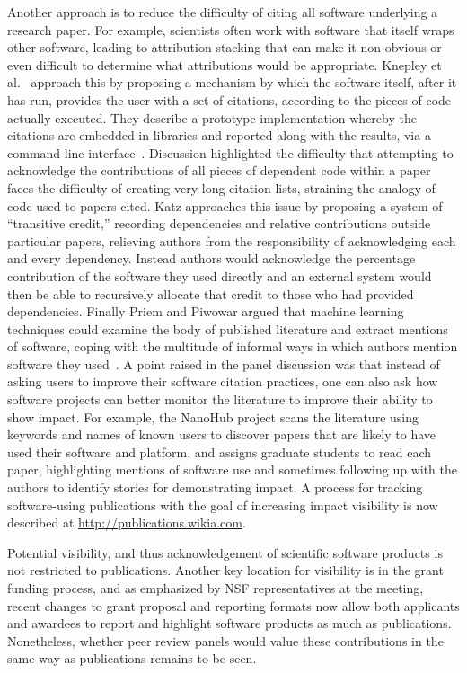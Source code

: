 \documentclass[11pt, oneside]{amsart}
\begin{document}
Another approach is to reduce the difficulty of citing all software
underlying a research paper. For example, scientists often work with
software that itself wraps other software, leading to attribution
stacking that can make it non-obvious or even difficult to determine
what attributions would be appropriate. Knepley et
al.~\cite{Knepley_WSSSPE} approach this by proposing a mechanism by
which the software itself, after it has run, provides the user with a
set of citations, according to the pieces of code actually
executed. They describe a prototype implementation whereby the
citations are embedded in libraries and reported along with the
results, via a command-line
interface~\cite{Knepley_WSSSPE}. Discussion highlighted the difficulty
that attempting to acknowledge the contributions of all pieces of
dependent code within a paper faces the difficulty of creating very
long citation lists, straining the analogy of code used to papers
cited. Katz approaches this issue by proposing a system of
``transitive credit,'' recording dependencies and relative
contributions outside particular papers, relieving authors from the
responsibility of acknowledging each and every dependency. Instead
authors would acknowledge the percentage contribution of the software
they used directly and an external system would then be able to
recursively allocate that credit to those who had provided
dependencies. Finally Priem and Piwowar argued that machine learning
techniques could examine the body of published literature and extract
mentions of software, coping with the multitude of informal ways in
which authors mention software they used~\cite{Priem_WSSSPE}.  A point
raised in the panel discussion was that instead of asking users to
improve their software citation practices, one can also ask how
software projects can better monitor the literature to improve their
ability to show impact. For example, the NanoHub project scans the
literature using keywords and names of known users to discover papers
that are likely to have used their software and platform, and assigns
graduate students to read each paper, highlighting mentions of
software use and sometimes following up with the authors to identify
stories for demonstrating impact.  A process for tracking
software-using publications with the goal of increasing impact
visibility is now described at \url{http://publications.wikia.com}.

Potential visibility, and thus acknowledgement of scientific software
products is not restricted to publications. Another key location for
visibility is in the grant funding process, and as emphasized by NSF
representatives at the meeting, recent changes to grant proposal and
reporting formats now allow both applicants and awardees to report and
highlight software products as much as publications. Nonetheless,
whether peer review panels would value these contributions in the same
way as publications remains to be seen.
\end{document}
